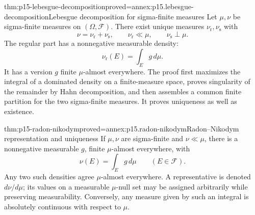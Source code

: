 \begin{hbtheorem}{thm:p15-lebesgue-decomposition}{proved=annex:p15.lebesgue-decomposition}{Lebesgue decomposition for sigma-finite measures}
Let \(\mu,\nu\) be sigma-finite measures on \((\Omega,\mathcal F)\).
There exist unique measures \(\nu_{\mathrm r},\nu_{\mathrm s}\) with
\[
 \nu=\nu_{\mathrm r}+\nu_{\mathrm s},\qquad
 \nu_{\mathrm r}\ll\mu,\qquad \nu_{\mathrm s}\perp\mu.
\]
The regular part has a nonnegative measurable density:
\[
                         \nu_{\mathrm r}(E)=\int_E g\,d\mu.
\]
It has a version \(g\) finite \(\mu\)-almost everywhere.
The proof first maximizes the integral of a dominated density on a
finite-measure space, proves singularity of the remainder by Hahn
decomposition, and then assembles a common finite partition for the two
sigma-finite measures. It proves uniqueness as well as existence.
\end{hbtheorem}

\begin{hbtheorem}{thm:p15-radon-nikodym}{proved=annex:p15.radon-nikodym}{Radon--Nikodym representation and uniqueness}
If \(\mu,\nu\) are sigma-finite and \(\nu\ll\mu\), there is a
nonnegative measurable \(g\), finite \(\mu\)-almost everywhere, with
\[
                              \nu(E)=\int_E g\,d\mu
                                      \qquad(E\in\mathcal F).
\]
Any two such densities agree \(\mu\)-almost everywhere.
A representative is denoted \(d\nu/d\mu\); its values on a measurable
\(\mu\)-null set may be assigned arbitrarily while preserving measurability.
Conversely, any measure given by such an integral is absolutely continuous
with respect to \(\mu\).
\end{hbtheorem}

